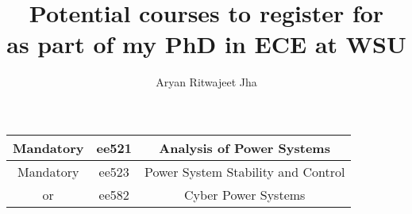 \documentclass{article}
\author{Aryan Ritwajeet Jha}
\date{}
\title{Potential courses to register for \\ as part of my PhD in ECE at WSU}
\begin{document}
	\maketitle
	
	\begin{tabular}{|c|c|c|}
		\hline
		Mandatory & ee521 & Analysis of Power Systems \\
		\hline
		Mandatory & ee523 & Power System Stability and Control \\
		\hline
		or & ee582 & Cyber Power Systems \\
		\hline
	\end{tabular}
\end{document}
